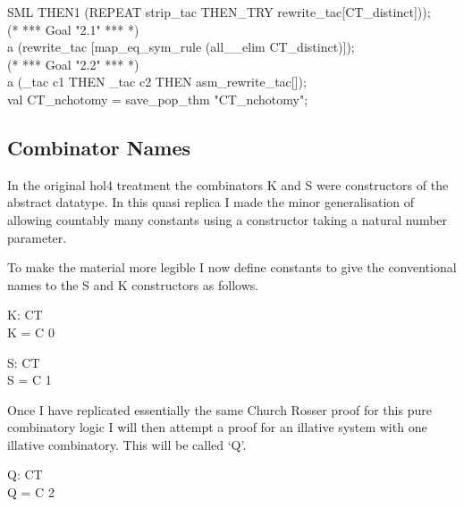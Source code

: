 {\begin{GFT}{SML}
\+	THEN1 (REPEAT strip\_tac THEN\_TRY rewrite\_tac[CT\_distinct]));\\
\+(* *** Goal "2.1" *** *)\\
\+a (rewrite\_tac [map\_eq\_sym\_rule (all\_\MMM{\forall}\_elim CT\_distinct)]);\\
\+(* *** Goal "2.2" *** *)\\
\+a (\MMM{\exists}\_tac \PrKM{}c1\PrKO{} THEN \MMM{\exists}\_tac \PrKM{}c2\PrKO{} THEN asm\_rewrite\_tac[]);\\
\+val CT\_nchotomy = save\_pop\_thm "CT\_nchotomy";\\
\end{GFT}
}%

\subsection{Combinator Names}

In the original hol4 treatment the combinators K and S were constructors of the abstract datatype.
In this quasi replica I made the minor generalisation of allowing countably many constants using a constructor taking a natural number parameter.

To make the material more legible I now define constants to give the conventional names to the S and K constructors as follows.

\begin{HOLConst}
\+\PrNM{} \PrNL{}K\PrNN{}: CT\\
\PrPH{}\PrPM{}\PrPM{}\PrPM{}\PrPM{}\PrPM{}\PrPM{}\PrPM{}\PrPM{}\PrPM{}\PrPM{}\PrPM{}
\+\PrNM{}	K = C 0\\
\end{HOLConst}

\begin{HOLConst}
\+\PrNM{} \PrNL{}S\PrNN{}: CT\\
\PrPH{}\PrPM{}\PrPM{}\PrPM{}\PrPM{}\PrPM{}\PrPM{}\PrPM{}\PrPM{}\PrPM{}\PrPM{}\PrPM{}
\+\PrNM{}	S = C 1\\
\end{HOLConst}

Once I have replicated essentially the same Church Rosser proof for this pure combinatory logic I will then attempt a proof for an illative system with one illative combinatory.
This will be called `Q'.

\begin{HOLConst}
\+\PrNM{} \PrNL{}Q\PrNN{}: CT\\
\PrPH{}\PrPM{}\PrPM{}\PrPM{}\PrPM{}\PrPM{}\PrPM{}\PrPM{}\PrPM{}\PrPM{}\PrPM{}\PrPM{}
\+\PrNM{}	Q = C 2\\
\end{HOLConst}

